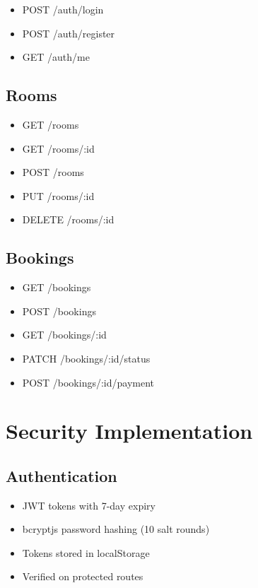 \documentclass[12pt, a4paper, oneside]{report}
\begin{document}
\begin{itemize}
  \item POST /auth/login
  \item POST /auth/register
  \item GET /auth/me
\end{itemize}

\section{Rooms}

\begin{itemize}
  \item GET /rooms
  \item GET /rooms/:id
  \item POST /rooms
  \item PUT /rooms/:id
  \item DELETE /rooms/:id
\end{itemize}

\section{Bookings}

\begin{itemize}
  \item GET /bookings
  \item POST /bookings
  \item GET /bookings/:id
  \item PATCH /bookings/:id/status
  \item POST /bookings/:id/payment
\end{itemize}

\chapter{Security Implementation}

\section{Authentication}

\begin{itemize}
  \item JWT tokens with 7-day expiry
  \item bcryptjs password hashing (10 salt rounds)
  \item Tokens stored in localStorage
  \item Verified on protected routes
\end{itemize}
\end{document}
